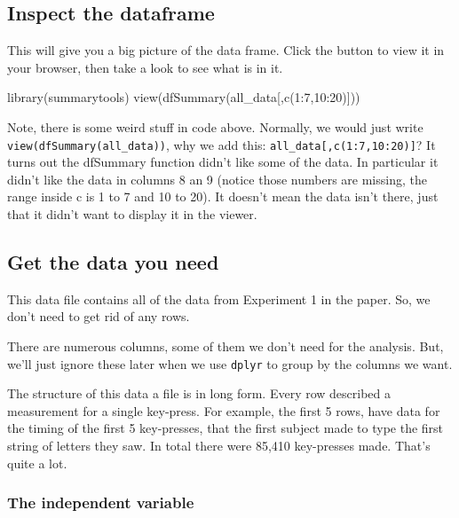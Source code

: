 \documentclass[
]{book}
\newenvironment{Shaded}{\begin{snugshade}}{\end{snugshade}}
\newcommand{\DecValTok}[1]{\textcolor[rgb]{0.00,0.00,0.81}{#1}}
\newcommand{\FunctionTok}[1]{\textcolor[rgb]{0.00,0.00,0.00}{#1}}
\newcommand{\NormalTok}[1]{#1}
\newcommand{\SpecialCharTok}[1]{\textcolor[rgb]{0.00,0.00,0.00}{#1}}
\begin{document}
\hypertarget{inspect-the-dataframe-1}{%
\subsection{Inspect the dataframe}\label{inspect-the-dataframe-1}}

This will give you a big picture of the data frame. Click the button to view it in your browser, then take a look to see what is in it.

\begin{Shaded}
\begin{Highlighting}[]
\FunctionTok{library}\NormalTok{(summarytools)}
\FunctionTok{view}\NormalTok{(}\FunctionTok{dfSummary}\NormalTok{(all\_data[,}\FunctionTok{c}\NormalTok{(}\DecValTok{1}\SpecialCharTok{:}\DecValTok{7}\NormalTok{,}\DecValTok{10}\SpecialCharTok{:}\DecValTok{20}\NormalTok{)]))}
\end{Highlighting}
\end{Shaded}

Note, there is some weird stuff in code above. Normally, we would just write \texttt{view(dfSummary(all\_data))}, why we add this: \texttt{all\_data{[},c(1:7,10:20){]}}? It turns out the dfSummary function didn't like some of the data. In particular it didn't like the data in columns 8 an 9 (notice those numbers are missing, the range inside c is 1 to 7 and 10 to 20). It doesn't mean the data isn't there, just that it didn't want to display it in the viewer.

\hypertarget{get-the-data-you-need-1}{%
\subsection{Get the data you need}\label{get-the-data-you-need-1}}

This data file contains all of the data from Experiment 1 in the paper. So, we don't need to get rid of any rows.

There are numerous columns, some of them we don't need for the analysis. But, we'll just ignore these later when we use \texttt{dplyr} to group by the columns we want.

The structure of this data a file is in long form. Every row described a measurement for a single key-press. For example, the first 5 rows, have data for the timing of the first 5 key-presses, that the first subject made to type the first string of letters they saw. In total there were 85,410 key-presses made. That's quite a lot.

\hypertarget{the-independent-variable-1}{%
\subsubsection{The independent variable}\label{the-independent-variable-1}}
\end{document}
